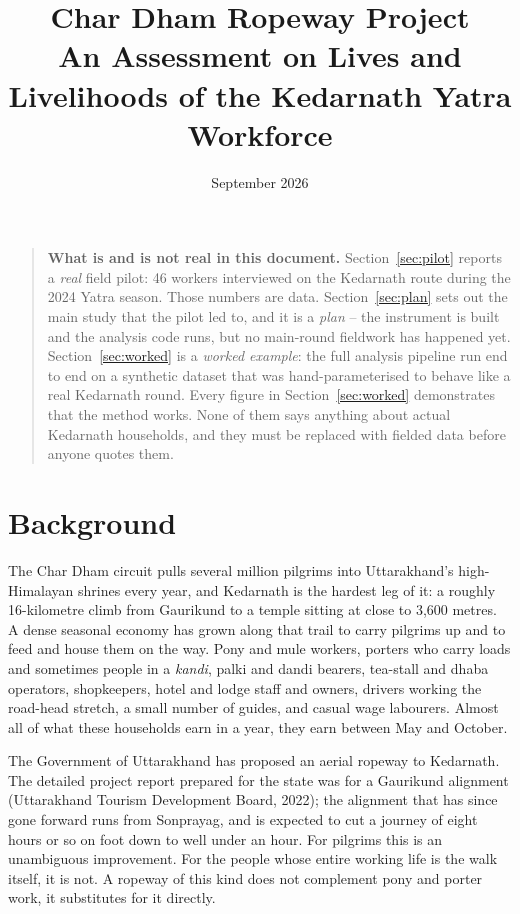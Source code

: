 \documentclass[11pt]{article}
\title{\textbf{Char Dham Ropeway Project} \\[4pt]
\large An Assessment on Lives and Livelihoods of the Kedarnath Yatra Workforce}
\author{}
\date{September 2026}
\begin{document}
\maketitle

\begin{quote}
\small
\noindent\textbf{What is and is not real in this document.} Section~\ref{sec:pilot}
reports a \emph{real} field pilot: 46 workers interviewed on the Kedarnath route during the
2024 Yatra season. Those numbers are data. Section~\ref{sec:plan} sets out the main study
that the pilot led to, and it is a \emph{plan} -- the instrument is built and the analysis
code runs, but no main-round fieldwork has happened yet. Section~\ref{sec:worked} is a
\emph{worked example}: the full analysis pipeline run end to end on a synthetic dataset that
was hand-parameterised to behave like a real Kedarnath round. Every figure in
Section~\ref{sec:worked} demonstrates that the method works. None of them says anything
about actual Kedarnath households, and they must be replaced with fielded data before anyone
quotes them.
\end{quote}

\tableofcontents
\bigskip

\section{Background}

The Char Dham circuit pulls several million pilgrims into Uttarakhand's high-Himalayan
shrines every year, and Kedarnath is the hardest leg of it: a roughly 16-kilometre climb from
Gaurikund to a temple sitting at close to 3,600 metres. A dense seasonal economy has grown
along that trail to carry pilgrims up and to feed and house them on the way. Pony and mule
workers, porters who carry loads and sometimes people in a \textit{kandi}, palki and dandi
bearers, tea-stall and dhaba operators, shopkeepers, hotel and lodge staff and owners,
drivers working the road-head stretch, a small number of guides, and casual wage labourers.
Almost all of what these households earn in a year, they earn between May and October.

The Government of Uttarakhand has proposed an aerial ropeway to Kedarnath. The detailed
project report prepared for the state was for a Gaurikund alignment (Uttarakhand Tourism
Development Board, 2022); the alignment that has since gone forward runs from Sonprayag, and
is expected to cut a journey of eight hours or so on foot down to well under an hour. For
pilgrims this is an unambiguous improvement. For the people whose entire working life is the
walk itself, it is not. A ropeway of this kind does not complement pony and porter work, it
substitutes for it directly.
\end{document}
